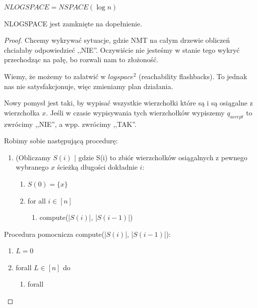 \begin{definition}
    \( NLOGSPACE = NSPACE(\log n) \)
\end{definition}

\begin{lemma}
    NLOGSPACE jest zamknięte na dopełnienie.
\end{lemma}
\begin{proof}
    Chcemy wykrywać sytuacje, gdzie NMT na całym drzewie obliczeń chciałaby odpowiedzieć ,,NIE''. Oczywiście nie jesteśmy w stanie tego wykryć przechodząc na pałę, bo rozwali nam to złożoność. 
    
    Wiemy, że możemy to załatwić w \(logspace^2\) (reachability flashbacks). To jednak nas nie satysfakcjonuje, więc zmieniamy plan działania.
    
    Nowy pomysł jest taki, by wypisać wszystkie wierzchołki które są i są osiągalne z wierzchołka $x$. Jeśli w czasie wypisywania tych wierzchołków wypiszemy $q_{accept}$ to zwrócimy ,,NIE'', a wpp. zwrócimy ,,TAK''.
    
    Robimy sobie następującą procedurę:
    
    \begin{enumerate}
        \item (Obliczamy \( S(i) \) | gdzie S(i) to zbiór wierzchołków osiągalnych z pewnego wybranego \(x\) ścieżką długości dokładnie \( i \): 
            \begin{enumerate}
                \item \( S(0) = \{ x \} \) 
                \item for all \( i \in [n] \) 
                \begin{enumerate}
                    \item compute(|\(S(i)\)|, |\(S(i-1)\)|)
                \end{enumerate}
            \end{enumerate}
    \end{enumerate}
    
    Procedura pomocnicza compute(|\(S(i)\)|, |\(S(i-1)\)|):
    
    \begin{enumerate}
        \item \( L = 0 \) 
        \item forall \( L \in [n] \) do 
        \begin{enumerate}
            \item forall 
        \end{enumerate}
    \end{enumerate}
\end{proof}


